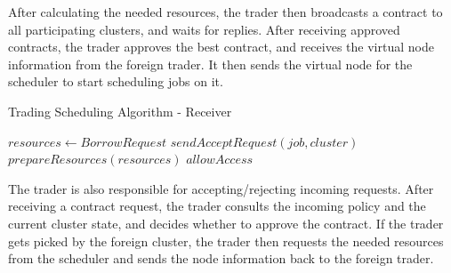 After calculating the needed resources, the trader then broadcasts a contract
to all participating clusters, and waits for replies. After receiving approved
contracts, the trader approves the best contract, and receives the virtual node
information from the foreign trader. It then sends the virtual node for the
scheduler to start scheduling jobs on it.

\begin{algorithm}[H]
    \caption{Trading Scheduling Algorithm - Receiver}
    \begin{algorithmic}
            \State $ resources \gets BorrowRequest $  
            \State $sendAcceptRequest(job, cluster)$
            \State $prepareResources(resources)$
            \State $allowAccess$
            \EndIf
    \end{algorithmic}
\end{algorithm} 

The trader is also responsible for accepting/rejecting incoming requests. After
receiving a contract request, the trader consults the incoming policy and the
current cluster state, and decides whether to approve the contract. If the
trader gets picked by the foreign cluster, the trader then requests the needed
resources from the scheduler and sends the node information back to the foreign
trader.
\newpage


